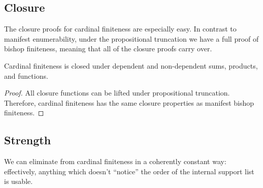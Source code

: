 \subsection{Closure}
The closure proofs for cardinal finiteness are especially easy.
In contrast to manifest enumerability, under the propositional truncation we
have a full proof of bishop finiteness, meaning that all of the closure proofs
carry over.
\begin{lemma}
  Cardinal finiteness is closed under dependent and non-dependent sums,
  products, and functions.
\end{lemma}
\begin{proof}
  All closure functions can be lifted under propositional truncation.
  Therefore, cardinal finiteness has the same closure properties as manifest
  bishop finiteness.
\end{proof}
\subsection{Strength}
We can eliminate from cardinal finiteness in a coherently constant way:
effectively, anything which doesn't ``notice'' the order of the internal support
list is usable.

